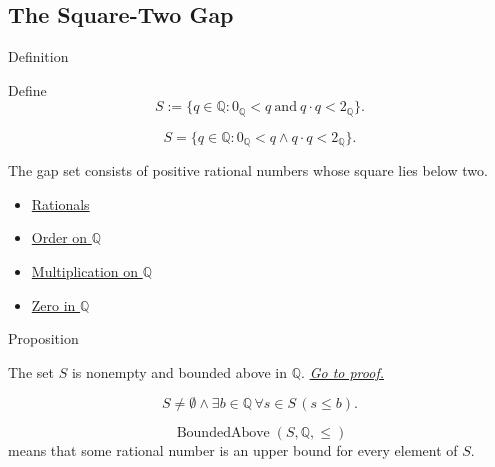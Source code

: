 \subsection*{The Square-Two Gap}

\begin{definitionbox}{Definition}
\begin{definition}
\label{def:gap-set-q}
Define
\[
S:=\{q\in\mathbb{Q}:0_{\mathbb{Q}}<q\ \text{and}\ q\cdot q<2_{\mathbb{Q}}\}.
\]
\end{definition}
\end{definitionbox}

\begin{remark*}
\[
S=\{q\in\mathbb{Q}:0_{\mathbb{Q}}<q\land q\cdot q<2_{\mathbb{Q}}\}.
\]
\end{remark*}

\begin{remark*}[Interpretation]
The gap set consists of positive rational numbers whose square lies below two.
\end{remark*}

\begin{dependencies}
\begin{itemize}
  \item \hyperref[def:rationals]{Rationals}
  \item \hyperref[def:order-on-q]{Order on $\mathbb{Q}$}
  \item \hyperref[def:multiplication-on-q-classes]{Multiplication on $\mathbb{Q}$}
  \item \hyperref[def:zero-in-q]{Zero in $\mathbb{Q}$}
\end{itemize}
\end{dependencies}

\begin{propositionbox}{Proposition}
\begin{proposition}
\label{prop:gap-set-bounded-above-q}
The set $S$ is nonempty and bounded above in $\mathbb{Q}$.
\hyperref[prf:gap-set-bounded-above-q]{\textit{Go to proof.}}
\end{proposition}
\end{propositionbox}

\begin{remark*}
\[
S\ne\emptyset
\land
\exists b\in\mathbb{Q}\,\forall s\in S\,(s\le b).
\]
\end{remark*}

\begin{remark*}
\[
\operatorname{BoundedAbove}(S,\mathbb{Q},\le)
\]
means that some rational number is an upper bound for every element of $S$.
\end{remark*}

